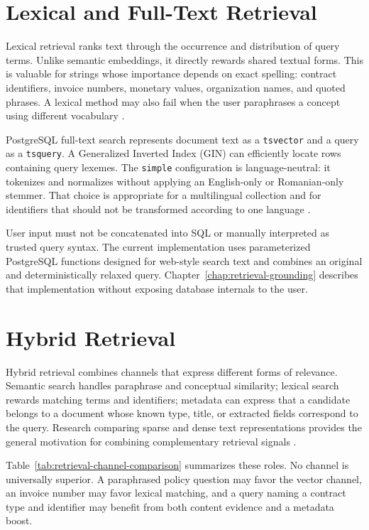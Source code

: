 \section{Lexical and Full-Text Retrieval}
\label{sec:background-lexical}

Lexical retrieval ranks text through the occurrence and distribution of query terms. Unlike semantic embeddings, it directly rewards shared textual forms. This is valuable for strings whose importance depends on exact spelling: contract identifiers, invoice numbers, monetary values, organization names, and quoted phrases. A lexical method may also fail when the user paraphrases a concept using different vocabulary \cite{Manning2008IR}.

PostgreSQL full-text search represents document text as a \texttt{tsvector} and a query as a \texttt{tsquery}. A Generalized Inverted Index (GIN) can efficiently locate rows containing query lexemes. The \texttt{simple} configuration is language-neutral: it tokenizes and normalizes without applying an English-only or Romanian-only stemmer. That choice is appropriate for a multilingual collection and for identifiers that should not be transformed according to one language \cite{PostgreSQLFTS}.

User input must not be concatenated into SQL or manually interpreted as trusted query syntax. The current implementation uses parameterized PostgreSQL functions designed for web-style search text and combines an original and deterministically relaxed query. Chapter~\ref{chap:retrieval-grounding} describes that implementation without exposing database internals to the user.

\section{Hybrid Retrieval}
\label{sec:background-hybrid}

Hybrid retrieval combines channels that express different forms of relevance. Semantic search handles paraphrase and conceptual similarity; lexical search rewards matching terms and identifiers; metadata can express that a candidate belongs to a document whose known type, title, or extracted fields correspond to the query. Research comparing sparse and dense text representations provides the general motivation for combining complementary retrieval signals \cite{Luan2021SparseDense}.

Table~\ref{tab:retrieval-channel-comparison} summarizes these roles. No channel is universally superior. A paraphrased policy question may favor the vector channel, an invoice number may favor lexical matching, and a query naming a contract type and identifier may benefit from both content evidence and a metadata boost.

